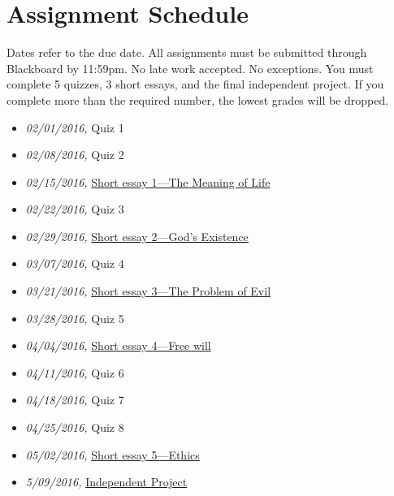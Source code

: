 \documentclass[article,oneside]{memoir}
\begin{document}
\section{ Assignment Schedule}
Dates refer to the due date. All assignments must be submitted through Blackboard by 11:59pm. No late work accepted. No exceptions. You must complete 5 quizzes, 3 short essays, and the final independent project. If you complete more than the required number, the lowest grades will be dropped.
\begin{itemize}
\item \textit{02/01/2016,} Quiz 1 
\item \textit{02/08/2016,} Quiz 2 
\item \textit{02/15/2016,} \href{http://scoconno.github.io/Teaching/Examined/Meaning/SW1/}{Short essay 1---The Meaning of Life} 
\item \textit{02/22/2016,} Quiz 3 
\item \textit{02/29/2016,} \href{http://scoconno.github.io/Teaching/Examined/God/SW2/}{Short essay 2---God's Existence}
\item \textit{03/07/2016,} Quiz 4
\item \textit{03/21/2016,}  \href{http://scoconno.github.io/Teaching/Examined/God/SW3}{Short essay 3---The Problem of Evil}
\item \textit{03/28/2016,} Quiz 5 
\item \textit{04/04/2016,}  \href{http://scoconno.github.io/Teaching/Examined/FreeWill/SW/}{Short essay 4---Free will}
\item \textit{04/11/2016,} Quiz 6
\item \textit{04/18/2016,} Quiz 7
\item \textit{04/25/2016,} Quiz 8
\item \textit{05/02/2016,} \href{http://scoconno.github.io/Teaching/Examined/Ethics/Essay/}{Short essay 5---Ethics}
\item \textit{5/09/2016,} \href{http://scoconno.github.io/Teaching/Examined/Applied/Essay/}{Independent Project}
\end{itemize}






\end{document}
